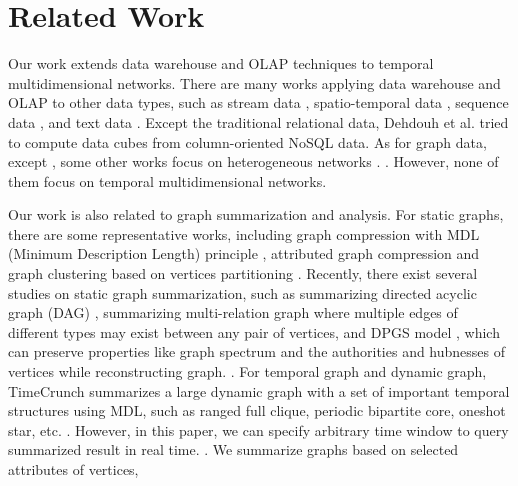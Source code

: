 \documentclass[10pt,journal,compsoc]{IEEEtran}
\begin{document}
\section{Related Work} \label{sec:related_work}
Our work extends data warehouse and OLAP techniques to temporal multidimensional networks. There are many works applying data warehouse and OLAP to other data types, such as stream data \cite{han2005stream}, spatio-temporal data \cite{gomez2009survey}, sequence data \cite{lo2008olap,liu2011cube}, and text data \cite{lin2008text}. Except the traditional relational data, Dehdouh et al. \cite{dehdouh2014columnar} tried to compute data cubes from column-oriented NoSQL data. As for graph data, except \cite{zhao2011graph}, some other works focus on heterogeneous networks \cite{yin2012hmgraph,wang2015tsmh}. . However, none of them focus on temporal multidimensional networks.

Our work is also related to graph summarization and analysis. For static graphs, there are some representative works, including graph compression with MDL (Minimum Description Length) principle \cite{navlakha2008graph}, attributed graph compression \cite{wu2014graph} and graph clustering based on vertices partitioning \cite{zhou2009graph}. Recently, there exist several studies on static graph summarization, such as summarizing directed acyclic graph (DAG) \cite{zhu2020top}, summarizing multi-relation graph \cite{ke2022multi} where multiple edges of different types may exist between any pair of vertices, and DPGS model \cite{zhou2021dpgs}, which can preserve properties like graph spectrum and the authorities and hubnesses of vertices while reconstructing graph. . For temporal graph and dynamic graph, TimeCrunch \cite{shah2015timecrunch} summarizes a large dynamic graph with a set of important temporal structures using MDL, such as ranged full clique, periodic bipartite core, oneshot star, etc. . However, in this paper, we can specify arbitrary time window to query summarized result in real time. . We summarize graphs based on selected attributes of vertices, 
\end{document}
